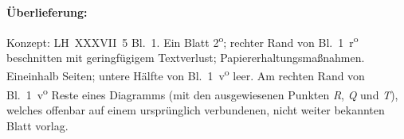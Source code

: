 %
%
%
%
%
\frenchspacing%
%
\begin{ledgroupsized}[r]{120mm}
\footnotesize
\pstart
\noindent\textbf{Überlieferung:}
\pend
\end{ledgroupsized}
\begin{ledgroupsized}[r]{114mm}
\footnotesize
\pstart
\parindent -6mm
%
Konzept: LH~XXXVII~5 Bl.~1.
Ein Blatt 2\textsuperscript{o};
rechter Rand von Bl.~1~r\textsuperscript{o} beschnitten mit geringfügigem Textverlust;
Papiererhaltungsmaßnahmen.
Eineinhalb Seiten;
untere Hälfte von Bl.~1~v\textsuperscript{o} leer.
Am rechten Rand von Bl.~1~v\textsuperscript{o} Reste eines Diagramms (mit den ausgewiesenen Punkten \textit{R}, \textit{Q} und \textit{T}), welches offenbar auf einem ursprünglich verbundenen, nicht weiter bekannten Blatt vorlag.
\pend
\end{ledgroupsized}
%
%
\vspace{5mm}
